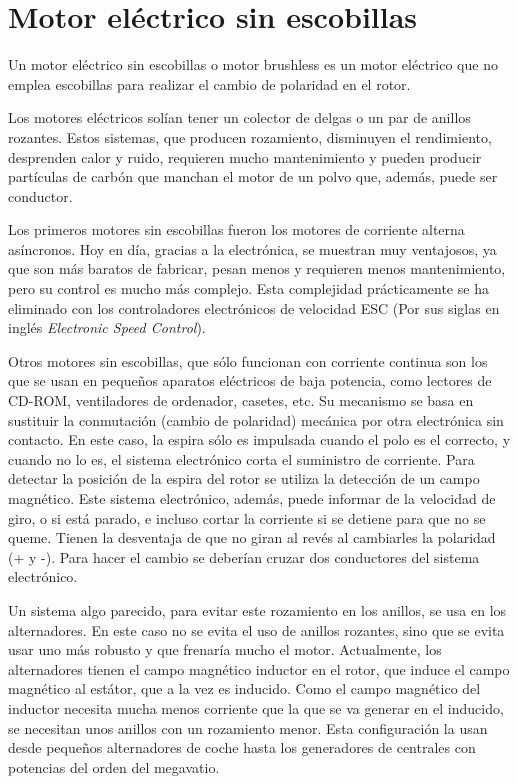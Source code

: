 \documentclass[../main]{subfiles}
\begin{document}
\setcounter{chapter}{4}
\chapter{Motor eléctrico sin escobillas}
Un motor eléctrico sin escobillas o motor brushless es un motor eléctrico que no emplea escobillas para realizar el cambio de polaridad en el rotor.

Los motores eléctricos solían tener un colector de delgas o un par de anillos rozantes. Estos sistemas, que producen rozamiento, disminuyen el rendimiento, desprenden calor y ruido, requieren mucho mantenimiento y pueden producir partículas de carbón que manchan el motor de un polvo que, además, puede ser conductor.


Los primeros motores sin escobillas fueron los motores de corriente alterna asíncronos. Hoy en día, gracias a la electrónica, se muestran muy ventajosos, ya que son más baratos de fabricar, pesan menos y requieren menos mantenimiento, pero su control es mucho más complejo. Esta complejidad prácticamente se ha eliminado con los controladores electrónicos de velocidad ESC (Por sus siglas en inglés \emph{Electronic Speed Control}).

Otros motores sin escobillas, que sólo funcionan con corriente continua son los que se usan en pequeños aparatos eléctricos de baja potencia, como lectores de CD-ROM, ventiladores de ordenador, casetes, etc. Su mecanismo se basa en sustituir la conmutación (cambio de polaridad) mecánica por otra electrónica sin contacto. En este caso, la espira sólo es impulsada cuando el polo es el correcto, y cuando no lo es, el sistema electrónico corta el suministro de corriente. Para detectar la posición de la espira del rotor se utiliza la detección de un campo magnético. Este sistema electrónico, además, puede informar de la velocidad de giro, o si está parado, e incluso cortar la corriente si se detiene para que no se queme. Tienen la desventaja de que no giran al revés al cambiarles la polaridad (+ y -). Para hacer el cambio se deberían cruzar dos conductores del sistema electrónico.

Un sistema algo parecido, para evitar este rozamiento en los anillos, se usa en los alternadores. En este caso no se evita el uso de anillos rozantes, sino que se evita usar uno más robusto y que frenaría mucho el motor. Actualmente, los alternadores tienen el campo magnético inductor en el rotor, que induce el campo magnético al estátor, que a la vez es inducido. Como el campo magnético del inductor necesita mucha menos corriente que la que se va generar en el inducido, se necesitan unos anillos con un rozamiento menor. Esta configuración la usan desde pequeños alternadores de coche hasta los generadores de centrales con potencias del orden del megavatio.
\end{document}
